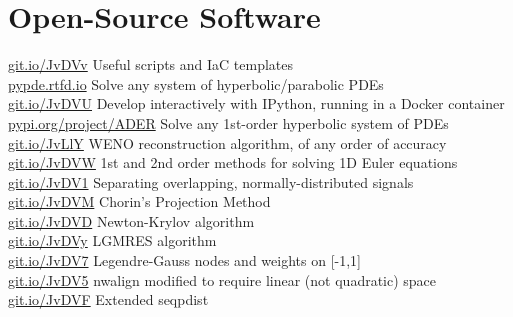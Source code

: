 \documentclass[a4paper]{custom-resume}
\begin{document}
\begin{minipage}[t][0.8\textheight]{0.66\textwidth}


\section{Open-Source Software}

\begin{flushleft}
\underline{git.io/JvDVv} \thinspace Useful scripts and IaC templates \\
\vspace{6pt}
\underline{pypde.rtfd.io} \thinspace Solve any system of hyperbolic/parabolic PDEs  \\
\vspace{6pt}
\underline{git.io/JvDVU} \thinspace Develop interactively with IPython, running in a Docker container \\
\vspace{6pt}
\underline{pypi.org/project/ADER} \thinspace Solve any 1st-order hyperbolic system of PDEs \\
\vspace{6pt}
\underline{git.io/JvLlY} \thinspace WENO reconstruction algorithm, of any order of accuracy \\
\vspace{6pt}
\underline{git.io/JvDVW} \thinspace 1st and 2nd order methods for solving 1D Euler equations \\
\vspace{6pt}
\underline{git.io/JvDV1} \thinspace Separating overlapping, normally-distributed signals \\
\vspace{6pt}
\underline{git.io/JvDVM} \thinspace Chorin's Projection Method \\
\vspace{6pt}
\underline{git.io/JvDVD} \thinspace Newton-Krylov algorithm \\
\vspace{6pt}
\underline{git.io/JvDVy} \thinspace LGMRES algorithm \\
\vspace{6pt}
\underline{git.io/JvDV7} \thinspace Legendre-Gauss nodes and weights on [-1,1] \\
\vspace{6pt}
\underline{git.io/JvDV5} \thinspace nwalign modified to require linear (not quadratic) space \\
\vspace{6pt}
\underline{git.io/JvDVF} \thinspace Extended seqpdist
\end{flushleft}


\end{minipage}
\end{document}

